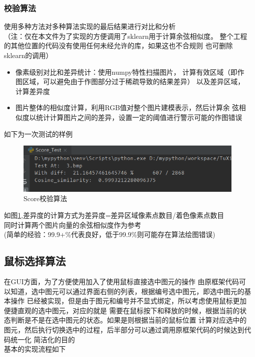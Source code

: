 \documentclass[a4paper,UTF8]{article}
\theoremstyle{definition}
\begin{document}
\subsubsection{校验算法}
使用多种方法对多种算法实现的最后结果进行对比和分析\\
（注：仅在本文件为了实现的方便调用了sklearn用于计算余弦相似度。
整个工程的其他位置的代码没有使用任何未经允许的库，如果这也不合规则
也可删除sklearn的调用）
\begin{itemize}
    \item 像素级别对比和差异统计：使用numpy特性扫描图片，
    计算有效区域（即作图区域，可以避免由于作图部分过于稀疏导致的结果差异）
    以及差异区域，计算差异度
    \item 图片整体的相似度计算，利用RGB值对整个图片建模表示，然后计算余
    弦相似度以统计计算图片之间的差异，设置一定的阈值进行警示可能的作图错误
\end{itemize}
如下为一次测试的样例\\

\begin{figure}[h]
	\centering
	\includegraphics[scale=0.6]{figure/test.png}
	\caption{Score校验算法}
	\label{fig:Score}
\end{figure}
如图\ref{fig:Score},差异度的计算方式为差异度=差异区域像素点数目/着色像素点数目\\
同时计算两个图片向量的余弦相似度作为参考\\
(简单的经验：99.9+\%代表良好，低于99.9\%则可能存在算法绘图错误)\\

\subsection{鼠标选择算法}
在GUI方面，为了方便使用加入了使用鼠标直接选中图元的操作
由原框架代码可以知道，选中图元可以通过界面右侧的列表，根据编号选中图元，即选中图元的基本操作
已经被实现，但是由于图元和编号并不显式绑定，所以考虑使用鼠标更加便捷直观的选中图元，对应的就是
需要在鼠标按下和释放的时候，根据当前的状态判断是不是在选中图元的状态。如果是则根据当前的鼠标位置
计算对应选中的图元，然后执行切换选中的过程，后半部分可以通过调用原框架代码的时候达到代码统一化
简洁化的目的\\
基本的实现流程如下
\end{document}
